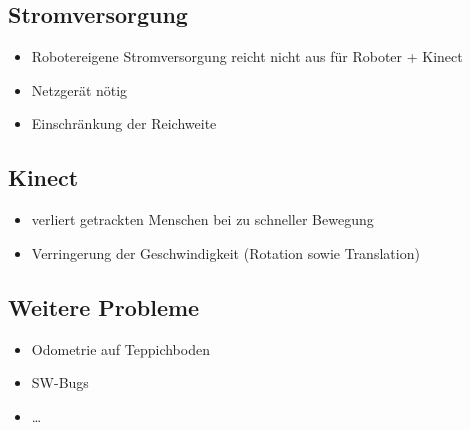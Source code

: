 \subsection{Stromversorgung}

\begin{itemize}
	\item Robotereigene Stromversorgung reicht nicht aus für Roboter + Kinect
	\item Netzgerät nötig
	\item Einschränkung der Reichweite
\end{itemize}

\subsection{Kinect}

\begin{itemize}
	\item verliert getrackten Menschen bei zu schneller Bewegung
	\item Verringerung der Geschwindigkeit (Rotation sowie Translation)
\end{itemize}


\subsection{Weitere Probleme}

\begin{itemize}
	\item Odometrie auf Teppichboden
	\item SW-Bugs
	\item \ldots
\end{itemize}
